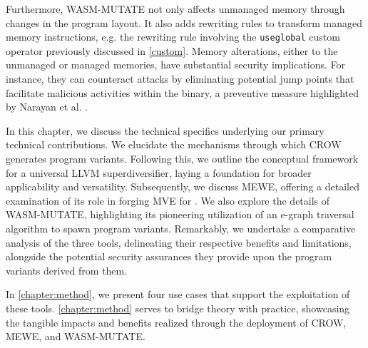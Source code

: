 Furthermore, WASM-MUTATE not only affects unmanaged memory through changes in the \Wasm program layout.
It also adds rewriting rules to transform managed memory instructions, e.g. the rewriting rule involving the \texttt{useglobal} custom operator previously discussed in \autoref{custom}.
Memory alterations, either to the unmanaged or managed memories, have substantial security implications. 
For instance, they can counteract attacks by eliminating potential jump points that facilitate malicious activities within the binary, a preventive measure highlighted by Narayan et al. \cite{Swivel}.


In this chapter, we discuss the technical specifics underlying our primary technical contributions.
We elucidate the mechanisms through which CROW generates program variants.
Following this, we outline the conceptual framework for a universal LLVM superdiversifier, laying a foundation for broader applicability and versatility.
Subsequently, we discuss MEWE, offering a detailed examination of its role in forging MVE for \Wasm. 
We also explore the details of WASM-MUTATE, highlighting its pioneering utilization of an e-graph traversal algorithm to spawn \wasm program variants. 
Remarkably, we undertake a comparative analysis of the three tools, delineating their respective benefits and limitations, alongside the potential security assurances they provide upon the program variants derived from them. 

In \autoref{chapter:method}, we present four use cases that support the exploitation of these tools.
\autoref{chapter:method} serves to bridge theory with practice, showcasing the tangible impacts and benefits realized through the deployment of CROW, MEWE, and WASM-MUTATE.
